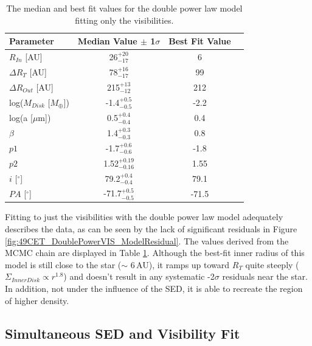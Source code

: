 {{\begin{table}
\begin{center}
    \def\arraystretch{1.37}%
    \begin{tabular}{l*{2}{c}r}
    \hline
    Parameter & Median Value $\pm$ 1$\sigma$ & Best Fit Value \\ \hline
     $R_{In}$  [AU] & 26$^{+20}_{-17}$ & 6\\  
     $\Delta R_{T}$ [AU] & 78$^{+16}_{-17}$ & 99\\ 
     $\Delta R_{Out}$ [AU] & 215$^{+13}_{-12}$ & 212\\ 
     log($M_{Disk}$ [$M_{\oplus}$]) & -1.4$^{+0.5}_{-0.5}$ & -2.2 \\
     log(a [$\mu$m]) & 0.5$^{+0.4}_{-0.4}$ & 0.4\\ 
     $\beta$ & 1.4$^{+0.3}_{-0.3}$ & 0.8\\ 
     $p1$ & -1.7$^{+0.6}_{-0.6}$ & -1.8\\ 
     $p2$ & 1.52$^{+0.19}_{-0.16}$ & 1.55\\ 
     $i$ [$^\circ$] & 79.2$^{+0.4}_{-0.4}$ & 79.1 \\ 
     $PA$ [$^\circ$] & -71.7$^{+0.5}_{-0.5}$ & -71.5\\
    \hline
    \end{tabular}
\end{center}
\caption{The median and best fit values for the double power law model fitting only the visibilities.}
\label{tab:49CET_DoublePowerVIS_Table}
\end{table}

Fitting to just the visibilities with the double power law model adequately describes the data, as can be seen by the lack of significant residuals in Figure \ref{fig:49CET_DoublePowerVIS_ModelResidual}. The values derived from the MCMC chain are displayed in Table \ref{tab:49CET_DoublePowerVIS_Table}. Although the best-fit inner radius of this model is still close to the star ($\sim$ 6\,AU), it ramps up toward $R_{T}$ quite steeply ($\Sigma_{Inner Disk} \propto r^{1.8}$) and doesn't result in any systematic -2$\sigma$ residuals near the star. In addition, not under the influence of the SED, it is able to recreate the region of higher density. 

\subsection{Simultaneous SED and Visibility Fit}

}}
